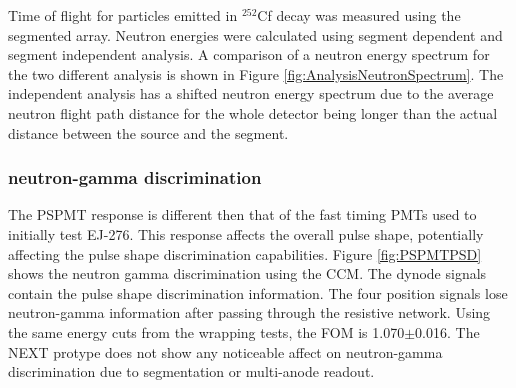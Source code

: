 Time of flight for particles emitted in $^{252}$Cf decay was measured using the segmented array. Neutron energies were calculated using segment dependent and segment independent analysis. A comparison of a neutron energy spectrum for the two different analysis is shown in Figure \ref{fig:AnalysisNeutronSpectrum}. The independent analysis has a shifted neutron energy spectrum due to the average neutron flight path distance for the whole detector being longer than the actual distance between the source and the segment.

\subsubsection{neutron-gamma discrimination}
The PSPMT response is different then that of the fast timing PMTs used to initially test EJ-276. This response affects the overall pulse shape, potentially affecting the pulse shape discrimination capabilities. Figure \ref{fig:PSPMTPSD} shows the neutron gamma discrimination using the CCM. The dynode signals contain the pulse shape discrimination information. The four position signals lose neutron-gamma information after passing through the resistive network. Using the same energy cuts from the wrapping tests, the FOM is 1.070$\pm$0.016. The NEXT protype does not show any noticeable affect on neutron-gamma discrimination due to segmentation or multi-anode readout.

%
%
%
%
